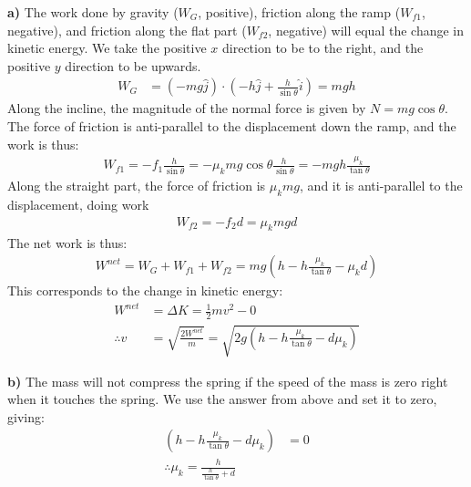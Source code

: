 \begin{solution}
\textbf{a)} The work done by gravity ($W_G$, positive), friction along the ramp ($W_{f1}$, negative), and friction along the flat part ($W_{f2}$, negative) will equal the change in kinetic energy. We take the positive $x$ direction to be to the right, and the positive $y$ direction to be upwards.
\begin{align*}
W_G &= (-mg\hat j)\cdot(-h\hat j+\frac{h}{\sin\theta}\hat i)=mgh
\end{align*}
Along the incline, the magnitude of the normal force is given by $N=mg\cos\theta$. The force of friction is anti-parallel to the displacement down the ramp, and the work is thus:
\begin{align*}
W_{f1}= -f_1\frac{h}{\sin\theta}=-\mu_k mg\cos\theta\frac{h}{\sin\theta}=-mgh\frac{\mu_k}{\tan\theta}
\end{align*}
Along the straight part, the force of friction is $\mu_kmg$, and it is anti-parallel to the displacement, doing work
\begin{align*}
W_{f2}= -f_2d=\mu_kmgd
\end{align*}
The net work is thus:
\begin{align*}
W^{net}=W_G+W_{f1}+W_{f2}=mg \left(h-h\frac{\mu_k}{\tan\theta}-\mu_kd\right)
\end{align*}
This corresponds to the change in kinetic energy:
\begin{align*}
W^{net}&=\Delta K = \frac{1}{2}mv^2-0 \\
\therefore v&=\sqrt{\frac{2W^{net}}{m}} = \sqrt{2g \left(h-h\frac{\mu_k}{\tan\theta}-d\mu_k\right)} 
\end{align*}

\textbf{b)} The mass will not compress the spring if the speed of the mass is zero right when it touches the spring. We use the answer from above and set it to zero, giving:
\begin{align*}
\left(h-h\frac{\mu_k}{\tan\theta}-d\mu_k\right) &= 0\\
\therefore \mu_k = \frac{h}{\frac{h}{\tan\theta}+d}
\end{align*}


\end{solution}
